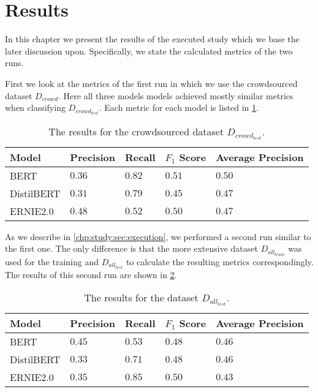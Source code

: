 \section{Results}
\label{chp:study:sec:results}
In this chapter we present the results of the executed study which we base the later discussion upon.
Specifically, we state the calculated metrics of the two runs.

First we look at the metrics of the first run in which we use the crowdsourced dataset $D_{crowd}$.
Here all three models models achieved mostly similar metrics when classifying $D_{crowd_{test}}$.
Each metric for each model is listed in \cref{tab:study:results:first_run}.
\begin{table}[htpb]
    \centering
    \begin{tabular}{l | l l l l }
        \toprule
         Model & Precision & Recall & $F_1$ Score & Average Precision \\
        \midrule
        \ac{BERT} & $0.36$ & $0.82$ & $0.51$ & $0.50$\\
        \ac{DistilBERT} & $0.31$ & $0.79$ & $0.45$ & $0.47$\\
        \ac{ERNIE2.0} & $0.48$ & $0.52$ & $0.50$ & $0.47$\\
        \bottomrule
    \end{tabular}
    \caption[Study Results on Crowdsourced Dataset]{The results for the crowdsourced dataset $D_{crowd_{test}}$.}\label{tab:study:results:first_run}
\end{table}

As we describe in \cref{chp:study:sec:execution}, we performed a second run similar to the first one.
The only difference is that the more extensive dataset $D_{all_{train}}$ was used for the training and $D_{all_{test}}$ to calculate the resulting metrics correspondingly.
The results of this second run are shown in \cref{tab:study:results:second_run}.
\begin{table}[htpb]
    \centering
    \begin{tabular}{l | l l l l }
        \toprule
         Model & Precision & Recall & $F_1$ Score & Average Precision \\
        \midrule
        \ac{BERT} & $0.45$ & $0.53$ & $0.48$ & $0.46$\\
        \ac{DistilBERT} & $0.33$ & $0.71$ & $0.48$ & $0.46$\\
        \ac{ERNIE2.0} & $0.35$ & $0.85$ & $0.50$ & $0.43$\\
        \bottomrule
    \end{tabular}
    \caption[Study Results on Complete Dataset]{The results for the dataset $D_{all_{test}}$.}\label{tab:study:results:second_run}
\end{table}
